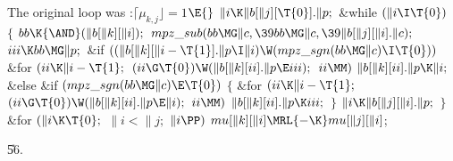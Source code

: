The original loop was
\Y\B\4:$\lceil\mu_{k,j}\rfloor = 1$\X${}\E{}$\6
$\|i\K\|b[\|j][\T{0}].\|p;{}$\6
\&{while} ${}(\|i\I\T{0}){}$\5
${}\{{}$\1\6
${}\\{bb}\K{\AND}(\|b[\|k][\|i]);{}$\6
${}\\{mpz\_sub}(\\{bb}\MG\|c,\39\\{bb}\MG\|c,\39\|b[\|j][\|i].\|c);{}$\6
${}\\{iii}\K\\{bb}\MG\|p;{}$\6
\&{if} ${}((\|b[\|k][\|i-\T{1}].\|p\I\|i)\W(\\{mpz\_sgn}(\\{bb}\MG\|c)\I%
\T{0})){}$\1\6
\&{for} ${}(\\{ii}\K\|i-\T{1};{}$ ${}(\\{ii}\G\T{0})\W(\|b[\|k][\\{ii}].\|p\E%
\\{iii});{}$ ${}\\{ii}\MM){}$\1\5
${}\|b[\|k][\\{ii}].\|p\K\|i;{}$\2\2\6
\&{else} \&{if} ${}(\\{mpz\_sgn}(\\{bb}\MG\|c)\E\T{0}){}$\5
${}\{{}$\1\6
\&{for} ${}(\\{ii}\K\|i-\T{1};{}$ ${}(\\{ii}\G\T{0})\W(\|b[\|k][\\{ii}].\|p\E%
\|i);{}$ ${}\\{ii}\MM){}$\1\5
${}\|b[\|k][\\{ii}].\|p\K\\{iii};{}$\2\6
\4${}\}{}$\2\6
${}\|i\K\|b[\|j][\|i].\|p;{}$\6
\4${}\}{}$\2\6
\&{for} ${}(\|i\K\T{0};{}$ ${}\|i<\|j;{}$ ${}\|i\PP){}$\1\5
${}\\{mu}[\|k][\|i]\MRL{-{\K}}\\{mu}[\|j][\|i]{}$;\2\par
\U56.\fi

